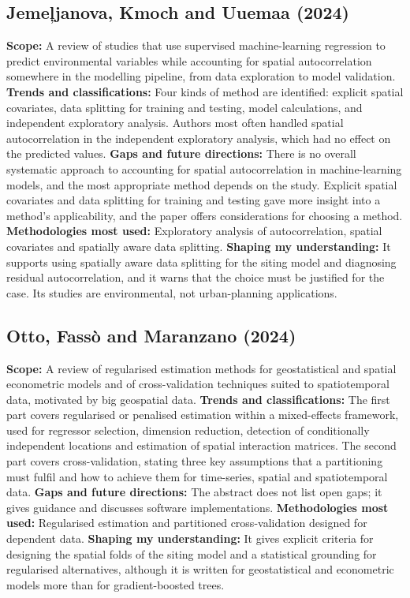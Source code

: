 \documentclass[pdflatex,sn-mathphys-num]{sn-jnl}
\begin{document}
\subsection{Jeme\c{l}janova, Kmoch and Uuemaa (2024) \cite{jemeljanova2024}}
\textbf{Scope:} A review of studies that use supervised machine-learning regression to predict environmental variables while accounting for spatial autocorrelation somewhere in the modelling pipeline, from data exploration to model validation.
\textbf{Trends and classifications:} Four kinds of method are identified: explicit spatial covariates, data splitting for training and testing, model calculations, and independent exploratory analysis. Authors most often handled spatial autocorrelation in the independent exploratory analysis, which had no effect on the predicted values.
\textbf{Gaps and future directions:} There is no overall systematic approach to accounting for spatial autocorrelation in machine-learning models, and the most appropriate method depends on the study. Explicit spatial covariates and data splitting for training and testing gave more insight into a method's applicability, and the paper offers considerations for choosing a method.
\textbf{Methodologies most used:} Exploratory analysis of autocorrelation, spatial covariates and spatially aware data splitting.
\textbf{Shaping my understanding:} It supports using spatially aware data splitting for the siting model and diagnosing residual autocorrelation, and it warns that the choice must be justified for the case. Its studies are environmental, not urban-planning applications.

\subsection{Otto, Fass\`{o} and Maranzano (2024) \cite{otto2024}}
\textbf{Scope:} A review of regularised estimation methods for geostatistical and spatial econometric models and of cross-validation techniques suited to spatiotemporal data, motivated by big geospatial data.
\textbf{Trends and classifications:} The first part covers regularised or penalised estimation within a mixed-effects framework, used for regressor selection, dimension reduction, detection of conditionally independent locations and estimation of spatial interaction matrices. The second part covers cross-validation, stating three key assumptions that a partitioning must fulfil and how to achieve them for time-series, spatial and spatiotemporal data.
\textbf{Gaps and future directions:} The abstract does not list open gaps; it gives guidance and discusses software implementations.
\textbf{Methodologies most used:} Regularised estimation and partitioned cross-validation designed for dependent data.
\textbf{Shaping my understanding:} It gives explicit criteria for designing the spatial folds of the siting model and a statistical grounding for regularised alternatives, although it is written for geostatistical and econometric models more than for gradient-boosted trees.
\end{document}
